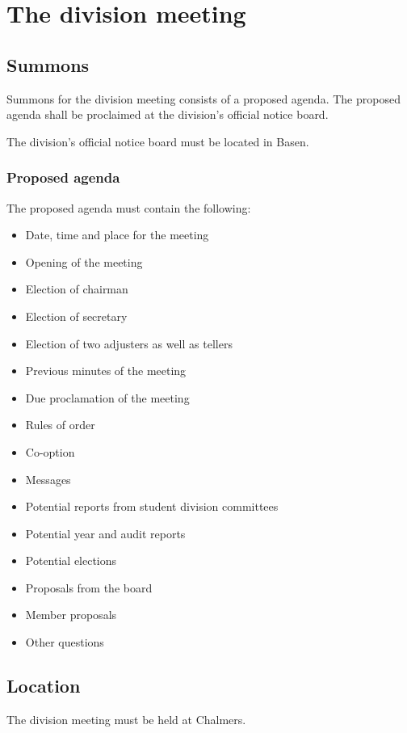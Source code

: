 \section{The division meeting}

\subsection{Summons}
Summons for the division meeting consists of a proposed agenda. The proposed agenda shall be proclaimed at the division's official notice board. 

The division's official notice board must be located in Basen. 

\subsubsection{Proposed agenda}
The proposed agenda must contain the following: 

\begin{itemize}  
  \item Date, time and place for the meeting
  \item Opening of the meeting
  \item Election of chairman
  \item Election of secretary
  \item Election of two adjusters as well as tellers
  \item Previous minutes of the meeting
  \item Due proclamation of the meeting
  \item Rules of order
  \item Co-option
  \item Messages 
  \item Potential reports from student division committees 
  \item Potential year and audit reports 
  \item Potential elections
  \item Proposals from the board
  \item Member proposals
  \item Other questions 
\end{itemize}
\subsection{Location}
The division meeting must be held at Chalmers.

 
